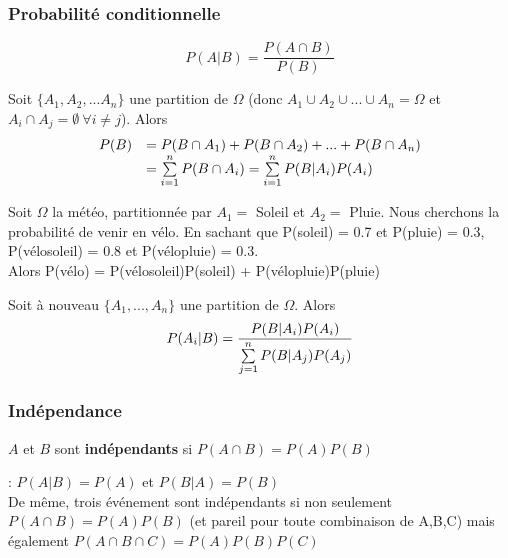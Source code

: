 \documentclass[11pt,a4paper]{article}
\numberwithin{equation}{section}
\begin{document}
\subsubsection{Probabilité conditionnelle}
\[P(A|B) = \frac{P(A \cap B)}{P(B)}\]
\begin{boite}
	Soit $\{A_1,A_2,...A_n\}$ une partition de $\Omega$ (donc $A_1 \cup A_2 \cup ... \cup A_n = \Omega$ et $A_i \cap A_j = \emptyset\ \forall i\neq j$). Alors 
	\begin{equation}
		\begin{array}{ll}
	P(B) &= P(B\cap A_1) + P(B\cap A_2) + ... + P(B \cap A_n)\\ &= \somme{n}{i=1} P(B \cap A_i) = \somme{n}{i=1} P(B|A_i)P(A_i)
		\end{array}
	\end{equation}
\end{boite}
\begin{exemple}
	Soit $\Omega$ la météo, partitionnée par $A_1 =$ Soleil et $A_2 =$ Pluie. Nous cherchons la probabilité de venir en vélo. En sachant que P(soleil) = 0.7 et P(pluie) = 0.3, P(vélo\textbar soleil) = 0.8 et P(vélo\textbar pluie) = 0.3.\\
	Alors P(vélo) = P(vélo\textbar soleil)P(soleil) + P(vélo\textbar pluie)P(pluie)
\end{exemple}
\begin{boite}
	Soit à nouveau $\{A_1,...,A_n\}$ une partition de $\Omega$. Alors 
	\begin{equation}
		P(A_i|B) = \frac{P(B|A_i)P(A_i)}{\somme{n}{j=1} P(B|A_j)P(A_j)}
	\end{equation}
\end{boite}
\subsubsection{Indépendance}
\begin{boite}[0.7]
	$A$ et $B$ sont \textbf{indépendants} si $P(A\cap B) = P(A)P(B)$
\end{boite}
 : $P(A|B) = P(A)$ et $P(B|A) = P(B)$\\
De même, trois événement sont indépendants si non seulement $P(A\cap B) = P(A)P(B)$ (et pareil pour toute combinaison de A,B,C) mais également $P(A\cap B\cap C) = P(A)P(B)P(C)$
\end{document}
